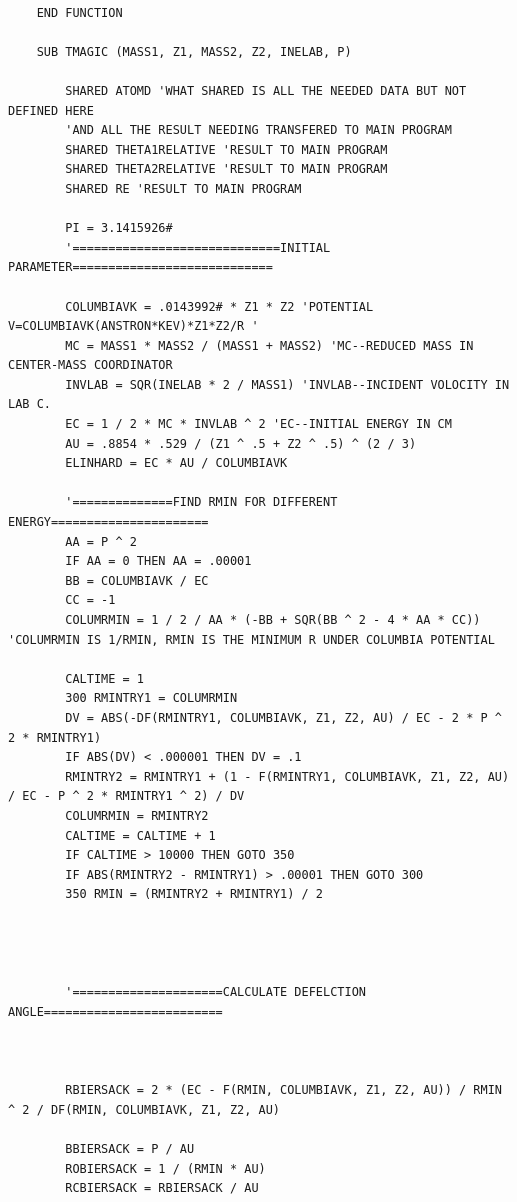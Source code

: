 \documentclass[10pt, reqno]{exam}
\begin{document}
\begin{verbatim}
    
    END FUNCTION
    
    SUB TMAGIC (MASS1, Z1, MASS2, Z2, INELAB, P)
    
        SHARED ATOMD 'WHAT SHARED IS ALL THE NEEDED DATA BUT NOT DEFINED HERE
        'AND ALL THE RESULT NEEDING TRANSFERED TO MAIN PROGRAM
        SHARED THETA1RELATIVE 'RESULT TO MAIN PROGRAM
        SHARED THETA2RELATIVE 'RESULT TO MAIN PROGRAM
        SHARED RE 'RESULT TO MAIN PROGRAM
    
        PI = 3.1415926#
        '=============================INITIAL PARAMETER============================
    
        COLUMBIAVK = .0143992# * Z1 * Z2 'POTENTIAL V=COLUMBIAVK(ANSTRON*KEV)*Z1*Z2/R '
        MC = MASS1 * MASS2 / (MASS1 + MASS2) 'MC--REDUCED MASS IN CENTER-MASS COORDINATOR
        INVLAB = SQR(INELAB * 2 / MASS1) 'INVLAB--INCIDENT VOLOCITY IN LAB C.
        EC = 1 / 2 * MC * INVLAB ^ 2 'EC--INITIAL ENERGY IN CM
        AU = .8854 * .529 / (Z1 ^ .5 + Z2 ^ .5) ^ (2 / 3)
        ELINHARD = EC * AU / COLUMBIAVK
    
        '==============FIND RMIN FOR DIFFERENT ENERGY======================
        AA = P ^ 2
        IF AA = 0 THEN AA = .00001
        BB = COLUMBIAVK / EC
        CC = -1
        COLUMRMIN = 1 / 2 / AA * (-BB + SQR(BB ^ 2 - 4 * AA * CC)) 'COLUMRMIN IS 1/RMIN, RMIN IS THE MINIMUM R UNDER COLUMBIA POTENTIAL
    
        CALTIME = 1
        300 RMINTRY1 = COLUMRMIN
        DV = ABS(-DF(RMINTRY1, COLUMBIAVK, Z1, Z2, AU) / EC - 2 * P ^ 2 * RMINTRY1)
        IF ABS(DV) < .000001 THEN DV = .1
        RMINTRY2 = RMINTRY1 + (1 - F(RMINTRY1, COLUMBIAVK, Z1, Z2, AU) / EC - P ^ 2 * RMINTRY1 ^ 2) / DV
        COLUMRMIN = RMINTRY2
        CALTIME = CALTIME + 1
        IF CALTIME > 10000 THEN GOTO 350
        IF ABS(RMINTRY2 - RMINTRY1) > .00001 THEN GOTO 300
        350 RMIN = (RMINTRY2 + RMINTRY1) / 2
    
    
    
    
        '=====================CALCULATE DEFELCTION ANGLE=========================
    
    
    
        RBIERSACK = 2 * (EC - F(RMIN, COLUMBIAVK, Z1, Z2, AU)) / RMIN ^ 2 / DF(RMIN, COLUMBIAVK, Z1, Z2, AU)
    
        BBIERSACK = P / AU
        ROBIERSACK = 1 / (RMIN * AU)
        RCBIERSACK = RBIERSACK / AU
    

\end{verbatim}
\end{document}
